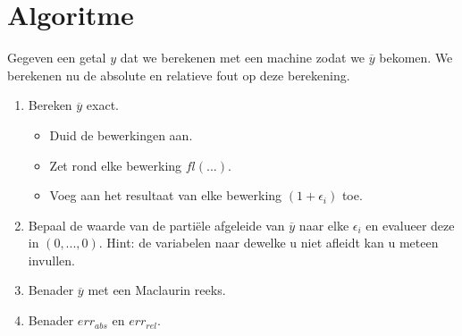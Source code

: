 \documentclass[10pt,a4paper]{article}
\begin{document}
\section{Algoritme}
Gegeven een getal $y$ dat we berekenen met een machine zodat we $\overline{y}$ bekomen. We berekenen nu de absolute en relatieve fout op deze berekening.
\begin{enumerate}
\item Bereken $\overline{y}$ exact.
\begin{itemize}
\item Duid de bewerkingen aan.
\item Zet rond elke bewerking $fl( ... )$.
\item Voeg aan het resultaat van elke bewerking $(1+\epsilon_i)$ toe.
\end{itemize}

\item Bepaal de waarde van de parti\"ele afgeleide van $\overline{y}$ naar elke $\epsilon_i$ en evalueer deze in $(0,...,0)$. Hint: de variabelen naar dewelke u niet afleidt kan u meteen invullen.

\item Benader $\overline{y}$ met een Maclaurin reeks.

\item Benader $err_{abs}$ en $err_{rel}$.
\end{enumerate}
\end{document}
